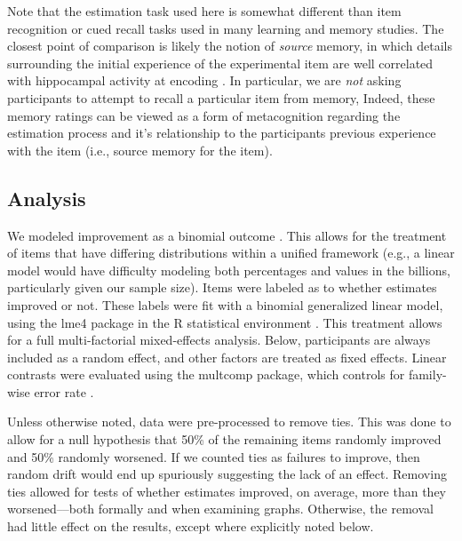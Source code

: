 Note that the estimation task used here is somewhat different than item
recognition or cued recall tasks used in many learning and memory studies. The
closest point of comparison is likely the notion of \emph{source} memory, in
which details surrounding the initial experience of the experimental item are
well correlated with hippocampal activity at encoding
\parencite{davachi_multiple_2003}. In particular, we are \emph{not} asking
participants to attempt to recall a particular item from memory, Indeed, these
memory ratings can be viewed as a form of metacognition regarding the estimation
process and it's relationship to the participants previous experience with the
item (i.e., source memory for the item).

\subsection{Analysis}

We modeled improvement as a binomial outcome \parencite[as
did][]{munnich_longevities_2005}. This allows for the treatment of items that have
differing distributions within a unified framework (e.g., a linear model would
have difficulty modeling both percentages and values in the billions,
particularly given our sample size).  Items were labeled as to whether estimates
improved or not. These labels were fit with a binomial generalized linear model,
using the lme4 package in the R statistical environment
\parencite{r_development_core_team_r:_2009_fixed}. This treatment allows for a full
multi-factorial mixed-effects analysis. Below, participants are always included
as a random effect, and other factors are treated as fixed effects. Linear
contrasts were evaluated using the multcomp package, which controls for
family-wise error rate \parencite{hothorn_simultaneous_2008}.

Unless otherwise noted, data were pre-processed to remove ties. This was done to
allow for a null hypothesis that 50\% of the remaining items randomly improved
and 50\% randomly worsened. If we counted ties as failures to improve, then
random drift would end up spuriously suggesting the lack of an effect. Removing
ties allowed for tests of whether estimates improved, on average, more than they
worsened––both formally and when examining graphs. Otherwise, the removal had
little effect on the results, except where explicitly noted below.


